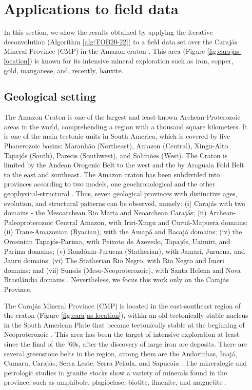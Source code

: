 \documentclass[utf8]{FrontiersinHarvard} %
\begin{document}
	\section{Applications to field data}
	\label{sec:real_data}
	
	In this section, we show the results obtained by applying the iterative deconvolution (Algorithm \ref{alg:TOB20-22}) 
	to a field data set over the Caraj{\'a}s Mineral Province (CMP) in the Amazon craton \citep{moroni-etal2001,villas-santos2001}. 
	This area (Figure \ref{fig:carajas-location}) is known for its intensive mineral exploration such as iron, copper, gold, 
	manganese, and, recently, bauxite.
	
	\subsection{Geological setting}
	
	The Amazon Craton is one of the largest and least-known Archean-Proterozoic areas in the world, comprehending a region with a thousand square kilometers. 
	It is one of the main tectonic units in South America, which is covered by five Phanerozoic basins: 
	Maranh{\~a}o (Northeast), Amazon (Central), Xingu-Alto Tapaj{\'o}s (South), Parecis (Southwest), and Solim{\~o}es (West). 
	The Craton is limited by the Andean Orogenic Belt to the west and the by Araguaia Fold Belt to the east and southeast. 
	The Amazon craton has been subdivided into provinces according to two models, one geochronological and the other geophysical-structural 
	\citep{amaral1974, teixeira-etal1989, tassinari-macambira1999}. Thus, seven geological provinces with distinctive ages, evolution, and structural 
	patterns can be observed, namely: (i) Caraj{\'a}s with two domains - the Mesoarchean Rio Maria and Neoarchean Caraj{\'a}s; 
	(ii) Archean-Paleoproterozoic Central Amazon, with Iriri-Xingu and Curuá-Mapuera domains; (ii) Trans-Amazonian (Ryacian), with the Amap{\'a} 
	and Bacaj{\'a} domains; (iv) the Orosinian Tapaj{\'o}s-Parima, with Peixoto de Azevedo, Tapaj{\'o}s, Uaimiri, and Parima domains; 
	(v) Rond{\^o}nia-Juruena (Statherian), with Jamari, Juruena, and Jauru domains; (vi) The Statherian Rio Negro, with Rio Negro and 
	Imeri domains; and (vii) Suns{\'a}s (Meso-Neoproterozoic), with Santa Helena and Nova Brasil{\^a}ndia domains \citep{santos-etal2000}. 
	Nevertheless, we focus this work only on the Caraj{\'a}s Province. 
	
	The Caraj{\'a}s Mineral Province (CMP) is located in the east-southeast region of the craton (Figure \ref{fig:carajas-location}), 
	within an old tectonically stable nucleus in the 
	South American Plate that became tectonically stable at the beginning of Neoproterozoic \citep{salomao-etal2019}. 
	This area has been the target of intensive exploration at least since the final of the '60s, after the discovery of large iron ore deposits. 
	There are several greenstone belts in the region, among them are the Andorinhas, Inajá, Cumaru, Caraj{\'a}s, Serra Leste, Serra Pelada, and Sapucaia 
	\citep{santos-etal2000}. The mineralogic and petrologic studies in granite stocks show a variety of minerals found in the province, such as 
	amphibole, plagioclase, biotite, ilmenite, and magnetite \citep{cunha-etal2016}. 
	
\end{document}
